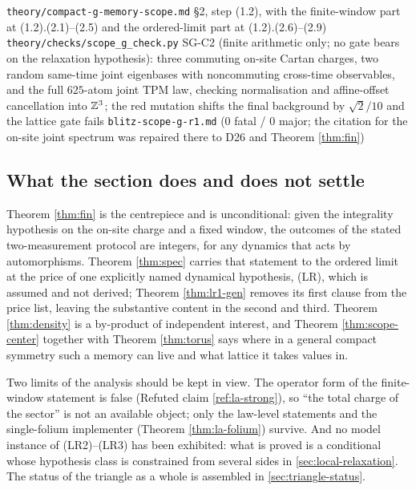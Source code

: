 {\texttt{theory/compact-g-memory-scope.md} \S2, step (1.2), with the
 finite-window part at (1.2).(2.1)--(2.5) and the ordered-limit part at
 (1.2).(2.6)--(2.9)}
{\texttt{theory/checks/scope\_g\_check.py} SG-C2 (finite arithmetic only; no
 gate bears on the relaxation hypothesis): three commuting on-site Cartan
 charges, two random same-time joint eigenbases with noncommuting cross-time
 observables, and the full $625$-atom joint TPM law, checking normalisation
 and affine-offset cancellation into $\mathbb{Z}^3$; the red mutation shifts the
 final background by $\sqrt2/10$ and the lattice gate fails}
{\texttt{blitz-scope-g-r1.md} (0 fatal / 0 major; the citation for the
 on-site joint spectrum was repaired there to D26 and Theorem
 \ref{thm:fin})}

\subsection{What the section does and does not settle}

Theorem \ref{thm:fin} is the centrepiece and is unconditional: given the
integrality hypothesis on the on-site charge and a fixed window, the outcomes
of the stated two-measurement protocol are integers, for any dynamics that
acts by automorphisms. Theorem \ref{thm:spec} carries that statement to the
ordered limit at the price of one explicitly named dynamical hypothesis, (LR),
which is assumed and not derived; Theorem \ref{thm:lr1-gen} removes its first
clause from the price list, leaving the substantive content in the second and
third. Theorem \ref{thm:density} is a by-product of independent interest, and
Theorem \ref{thm:scope-center} together with Theorem \ref{thm:torus} says
where in a general compact symmetry such a memory can live and what lattice it
takes values in.

Two limits of the analysis should be kept in view. The operator form of the
finite-window statement is false (Refuted claim \ref{ref:la-strong}), so
``the total charge of the sector'' is not an available object; only the
law-level statements and the single-folium implementer (Theorem
\ref{thm:la-folium}) survive. And no model instance of (LR2)--(LR3) has been
exhibited: what is proved is a conditional whose hypothesis class is
constrained from several sides in \cref{sec:local-relaxation}. The status of
the triangle as a whole is assembled in \cref{sec:triangle-status}.
